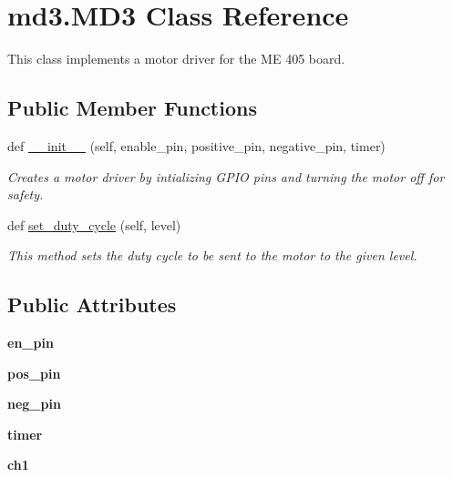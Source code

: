 \hypertarget{classmd3_1_1MD3}{}\section{md3.\+M\+D3 Class Reference}
\label{classmd3_1_1MD3}


This class implements a motor driver for the ME 405 board.  


\subsection*{Public Member Functions}
\begin{DoxyCompactItemize}
\item 
def \hyperlink{classmd3_1_1MD3_aaafcf0640766d669d393da38c9f0c0b7}{\+\_\+\+\_\+init\+\_\+\+\_\+} (self, enable\+\_\+pin, positive\+\_\+pin, negative\+\_\+pin, timer)
\begin{DoxyCompactList}\small\item\em Creates a motor driver by intializing G\+P\+IO pins and turning the motor off for safety. \end{DoxyCompactList}\item 
def \hyperlink{classmd3_1_1MD3_a2ebff4852a7df2c780bbaf171b7f458a}{set\+\_\+duty\+\_\+cycle} (self, level)
\begin{DoxyCompactList}\small\item\em This method sets the duty cycle to be sent to the motor to the given level. \end{DoxyCompactList}\end{DoxyCompactItemize}
\subsection*{Public Attributes}
\begin{DoxyCompactItemize}
\item 
{\bfseries en\+\_\+pin}\hypertarget{classmd3_1_1MD3_ad23e086398476e29dd924db9a10b729e}{}\label{classmd3_1_1MD3_ad23e086398476e29dd924db9a10b729e}

\item 
{\bfseries pos\+\_\+pin}\hypertarget{classmd3_1_1MD3_aa30cea867f9013ea009d962b1924f8cb}{}\label{classmd3_1_1MD3_aa30cea867f9013ea009d962b1924f8cb}

\item 
{\bfseries neg\+\_\+pin}\hypertarget{classmd3_1_1MD3_af78a6d9e79b9ce83a196d568c4d96753}{}\label{classmd3_1_1MD3_af78a6d9e79b9ce83a196d568c4d96753}

\item 
{\bfseries timer}\hypertarget{classmd3_1_1MD3_a83509fc678f86cb5ca82cceb6e4b07ff}{}\label{classmd3_1_1MD3_a83509fc678f86cb5ca82cceb6e4b07ff}

\item 
{\bfseries ch1}\hypertarget{classmd3_1_1MD3_acf7bb01db78bebb381c2ea386edac0b4}{}\label{classmd3_1_1MD3_acf7bb01db78bebb381c2ea386edac0b4}

\end{DoxyCompactItemize}


